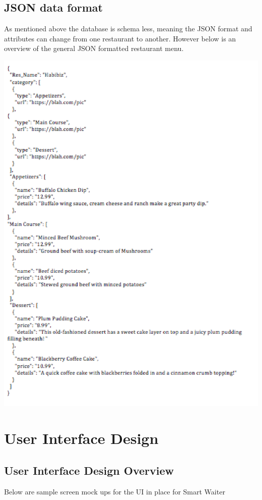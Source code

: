 \documentclass[12pt, titlepage]{article}
\begin{document}
\subsection{JSON data format}
As mentioned above the database is schema less, meaning the JSON format and attributes can change from one restaurant to another. However below is an overview of the general JSON formatted restaurant menu.

\includegraphics[width=150mm,scale=0.5]{JSONdata.png}


\section{User Interface Design}

\subsection{User Interface Design Overview}
Below are sample screen mock ups for the UI in place for Smart Waiter
\end{document}

